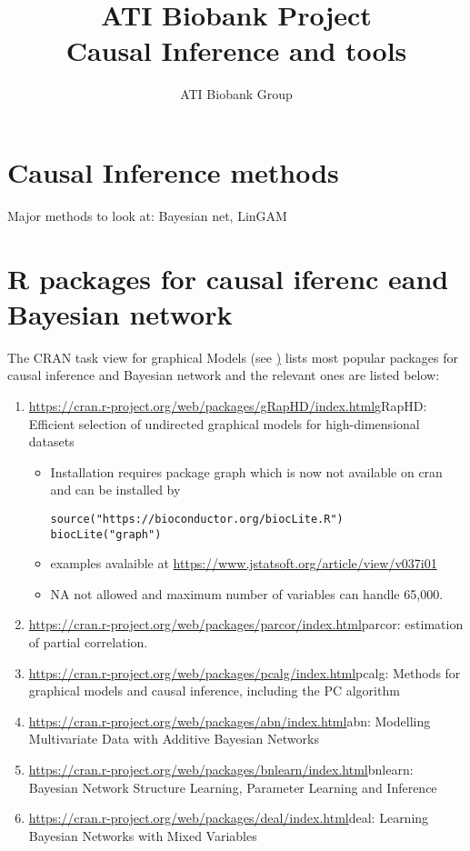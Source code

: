 \documentclass{article}
\begin{document}
\title{ATI Biobank Project \\ Causal Inference and tools}

\author{ATI Biobank Group}

\maketitle

\section{Causal Inference methods}
Major methods to look at: Bayesian net, LinGAM
\section{R packages for causal iferenc eand Bayesian network}
The CRAN task view for graphical Models (see \href{https://cran.r-project.org/web/views/gR.html}) lists most popular packages for causal inference and Bayesian network and the relevant ones are listed below:

\begin{enumerate}
\item \url{https://cran.r-project.org/web/packages/gRapHD/index.html}{gRapHD}: Efficient selection of undirected graphical models for high-dimensional datasets
\begin{itemize}
\item Installation requires package graph which is now not available on cran and can be installed by 
\begin{verbatim}
source("https://bioconductor.org/biocLite.R")
biocLite("graph")
\end{verbatim}
\item examples avalaible at \url{https://www.jstatsoft.org/article/view/v037i01}
\item NA not allowed and maximum number of variables can handle 65,000.

\end{itemize}
\item \url{https://cran.r-project.org/web/packages/parcor/index.html}{parcor}: estimation of partial correlation.
\item \url{https://cran.r-project.org/web/packages/pcalg/index.html}{pcalg}: Methods for graphical models and causal inference, including the PC algorithm 
\item \url{https://cran.r-project.org/web/packages/abn/index.html}{abn}: Modelling Multivariate Data with Additive Bayesian Networks
\item \url{https://cran.r-project.org/web/packages/bnlearn/index.html}{bnlearn}: Bayesian Network Structure Learning, Parameter Learning and Inference
\item \url{https://cran.r-project.org/web/packages/deal/index.html}{deal}: Learning Bayesian Networks with Mixed Variables

\end{enumerate}
\end{document}
